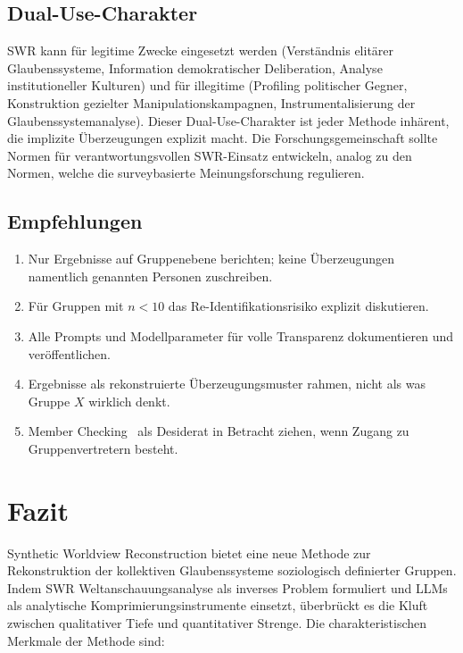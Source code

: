 \documentclass[11pt,a4paper]{article}
\begin{document}
\subsection{Dual-Use-Charakter}

SWR kann für legitime Zwecke eingesetzt werden (Verständnis elitärer Glaubenssysteme, Information demokratischer Deliberation, Analyse institutioneller Kulturen) und für illegitime (Profiling politischer Gegner, Konstruktion gezielter Manipulationskampagnen, Instrumentalisierung der Glaubenssystemanalyse). Dieser Dual-Use-Charakter ist jeder Methode inhärent, die implizite Überzeugungen explizit macht. Die Forschungsgemeinschaft sollte Normen für verantwortungsvollen SWR-Einsatz entwickeln, analog zu den Normen, welche die surveybasierte Meinungsforschung regulieren.

\subsection{Empfehlungen}

\begin{enumerate}[nosep]
  \item Nur Ergebnisse auf Gruppenebene berichten; keine Überzeugungen namentlich genannten Personen zuschreiben.
  \item Für Gruppen mit $n < 10$ das Re-Identifikationsrisiko explizit diskutieren.
  \item Alle Prompts und Modellparameter für volle Transparenz dokumentieren und veröffentlichen.
  \item Ergebnisse als \glqq{}rekonstruierte Überzeugungsmuster\grqq{} rahmen, nicht als \glqq{}was Gruppe $X$ wirklich denkt\grqq{}.
  \item Member Checking~\citep{SoysalTurkmen2024} als Desiderat in Betracht ziehen, wenn Zugang zu Gruppenvertretern besteht.
\end{enumerate}


\section{Fazit}
\label{sec:conclusion}

Synthetic Worldview Reconstruction bietet eine neue Methode zur Rekonstruktion der kollektiven Glaubenssysteme soziologisch definierter Gruppen. Indem SWR Weltanschauungsanalyse als inverses Problem formuliert und LLMs als analytische Komprimierungsinstrumente einsetzt, überbrückt es die Kluft zwischen qualitativer Tiefe und quantitativer Strenge. Die charakteristischen Merkmale der Methode sind:
\end{document}
